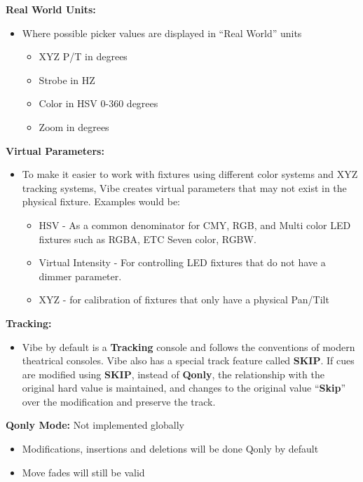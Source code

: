 \documentclass[
]{article}
\providecommand{\tightlist}{%
  \setlength{\itemsep}{0pt}\setlength{\parskip}{0pt}}
\begin{document}
\textbf{Real World Units:}

\begin{itemize}
\item
  Where possible picker values are displayed in ``Real World'' units

  \begin{itemize}
  \item
    {XYZ P/T in degrees}
  \item
    Strobe in HZ
  \item
    {Color in HSV 0-360 degrees}
  \item
    {Zoom in degrees}
  \end{itemize}
\end{itemize}

\textbf{Virtual Parameters:}

\begin{itemize}
\item
  To make it easier to work with fixtures using different color systems and XYZ tracking systems, Vibe creates virtual parameters that may not exist in the physical fixture. Examples would be:

  \begin{itemize}
  \item
    HSV - As a common denominator for CMY, RGB, and Multi color LED fixtures such as RGBA, ETC Seven color, RGBW.
  \item
    Virtual Intensity - For controlling LED fixtures that do not have a dimmer parameter.
  \item
    XYZ - for calibration of fixtures that only have a physical Pan/Tilt
  \end{itemize}
\end{itemize}

\textbf{Tracking:}

\begin{itemize}
\tightlist
\item
  Vibe by default is a \textbf{Tracking} console and follows the conventions of modern theatrical consoles. Vibe also has a special track feature called \textbf{SKIP}. If cues are modified using \textbf{SKIP}, instead of \textbf{Qonly}, the relationship with the original hard value is maintained, and changes to the original value ``\textbf{Skip}'' over the modification and preserve the track.
\end{itemize}

\textbf{Qonly Mode:} {Not implemented globally}

\begin{itemize}
\item
  {Modifications, insertions and deletions will be done Qonly by default}
\item
  {Move fades will still be valid}
\end{itemize}
\end{document}
